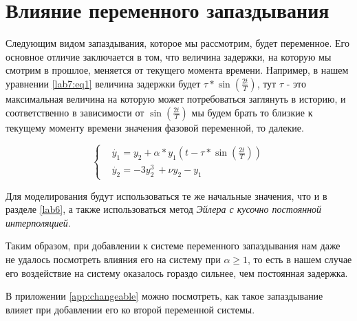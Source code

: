 \chapter{Влияние переменного запаздывания}\label{lab7}

Следующим видом запаздывания, которое мы рассмотрим, будет
переменное. Его основное отличие заключается в том, что
величина задержки, на которую мы смотрим в прошлое,
меняется от текущего момента времени. Например,
в нашем уравнении \eqref{lab7:eq1} величина задержки будет
$\tau*\sin(\frac{2t}{T})$, тут $\tau$ - это максимальная
величина на которую может потребоваться заглянуть в историю,
и соответственно в зависимости от $\sin(\frac{2t}{T})$ мы будем
брать то близкие к текущему моменту времени значения фазовой
переменной, то далекие.

\begin{equation}\label{lab7:eq1}
  \begin{cases}
      &\dot{y_1} = y_2 + \alpha * y_1(t-\tau*\sin(\frac{2t}{T}))\\
      &\dot{y_2} = -3y_2^3\ + \nu y_2 - y_1
  \end{cases}
\end{equation}

Для моделирования будут использоваться те же начальные
значения, что и в разделе \ref{lab6}, а также использоваться
метод \textit{Эйлера с кусочно постоянной интерполяцией}.

\clearpage

Таким образом, при добавлении к системе переменного запаздывания
нам даже не удалось посмотреть влияния его на систему при
$\alpha \geq 1$, то есть в нашем случае его воздействие на
систему оказалось гораздо сильнее, чем постоянная задержка.

В приложении \ref{app:changeable} можно посмотреть, как
такое запаздывание влияет при добавлении его ко второй
переменной системы.
